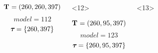 \begin{frame}
\begin{columns}[c]
\begin{onlyenv}
            \begin{minipage}[c][0.5\textheight][c]{\linewidth}
                \begin{displaybox}[0.95\linewidth]
                    \begin{minipage}[c][0.45\textheight][c]{0.95\linewidth}
                        \[
                            \mathbf{T_{}} = (260,260,397)
                        \]\vspace{0mm}
                        \[
                            model = 112
                        \]\vspace{0mm}
                        \[
                            \boldsymbol{\tau_{}} = \{260,397\}
                        \]\vspace{0mm}
                    \end{minipage}
                \end{displaybox}
            \end{minipage}
        \end{onlyenv}
        \begin{onlyenv}<12>
            \begin{minipage}[c][0.5\textheight][c]{\linewidth}
                \begin{displaybox}[0.95\linewidth]
                    \begin{minipage}[c][0.45\textheight][c]{0.95\linewidth}
                        \[
                            \mathbf{T_{}} = (260,95,397)
                        \]\vspace{0mm}
                        \[
                            model = 123
                        \]\vspace{0mm}
                        \[
                            \boldsymbol{\tau_{}} = \{260,95,397\}
                        \]\vspace{0mm}
                    \end{minipage}
                \end{displaybox}
            \end{minipage}
        \end{onlyenv}
        \begin{onlyenv}<13>
            \begin{minipage}[c][0.5\textheight][c]{\linewidth}
                \begin{displaybox}[0.95\linewidth]
                    \begin{minipage}[c][0.45\textheight][c]{0.95\linewidth}
                        \[
\]
\end{minipage}
\end{displaybox}
\end{minipage}
\end{onlyenv}
\end{columns}
\end{frame}
